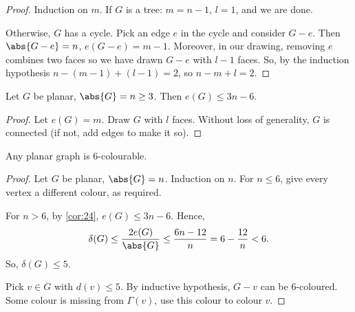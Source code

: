 \documentclass{article}
\begin{document}
\begin{proof}
    Induction on $m$. If $G$ is a tree: $m = n-1$, $l = 1$, and we are done.

    Otherwise, $G$ has a cycle. Pick an edge $e$ in the cycle and consider $G-e$. Then $\abs{G - e} = n$, $e(G-e) = m-1$.
    Moreover, in our drawing, removing $e$ combines two faces so we have drawn $G-e$ with $l-1$ faces.
    So, by the induction hypothesis $n - (m-1) + (l-1) = 2$, so $n - m + l = 2$.
\end{proof}

\begin{ncor}\label{cor:24}
    Let $G$ be planar, $\abs{G} = n \geq 3$. Then $e(G) \leq 3n-6$.
\end{ncor}

\begin{proof}
    Let $e(G) = m$. Draw $G$ with $l$ faces. Without loss of generality, $G$ is connected (if not, add edges to make it so).
\end{proof}

\begin{nprop}\label{prop:25}
    Any planar graph is 6-colourable.
\end{nprop}

\begin{proof}
    Let $G$ be planar, $\abs{G} = n$. Induction on $n$.
    For $n \leq 6$, give every vertex a different colour, as required.

    For $n > 6$, by \cref{cor:24}, $e(G) \leq 3n - 6$. Hence,
    \begin{equation*}
        \delta(G) \leq \frac{2 e(G)}{\abs{G}} \leq \frac{6n-12}{n} = 6 - \frac{12}{n} < 6.
    \end{equation*}
    So, $\delta(G) \leq 5$.

    Pick $v \in G$ with $d(v) \leq 5$. By inductive hypothesis, $G- v$ can be 6-coloured. Some colour is missing from $\Gamma(v)$, use this colour to colour $v$.
\end{proof}
\end{document}
